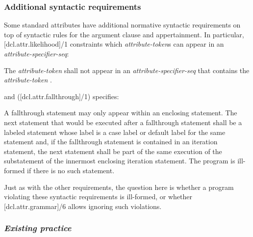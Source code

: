 \subsubsection{Additional syntactic requirements}

\label{subsec:additionalreqs}
Some standard attributes have additional normative syntactic requirements on top of syntactic rules for the argument clause and appertainment. In particular, [dcl.attr.likelihood]/1 constraints which \emph{attribute-token}s can appear in an \emph{attribute-specifier-seq}:


\begin{adjustwidth}{0.5cm}{0.5cm}
The \emph{attribute-token}  shall not appear in an \emph{attribute-specifier-seq} that contains the \emph{attribute-token} .
\end{adjustwidth}

and ([dcl.attr.fallthrough]/1) specifies:

\begin{adjustwidth}{0.5cm}{0.5cm}
A fallthrough statement may only appear within an enclosing  statement. The next statement that would be executed after a fallthrough statement shall be a labeled statement whose label is a case label or default label for the same  statement and, if the fallthrough statement is contained in an iteration statement, the next statement shall be part of the same execution of the substatement of the innermost enclosing iteration statement. The program is ill-formed if there is no such statement.
\end{adjustwidth}

Just as with the other requirements, the question here is whether a program violating these syntactic requirements is ill-formed, or whether [dcl.attr.grammar]/6 allows ignoring such violations.

\subsubsection*{\emph{Existing practice}}

